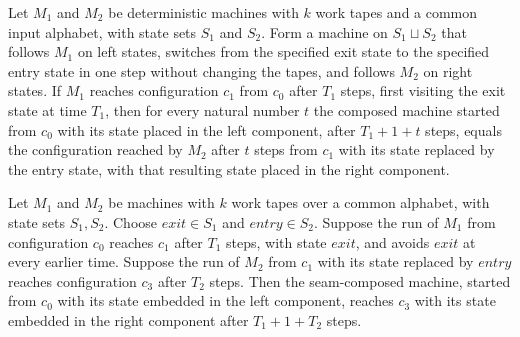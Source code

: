 \begin{theorem}
\label{Turing.seamCompTM_runFrom_right}
\leanok
{}
Let $M_1$ and $M_2$ be deterministic machines with $k$ work tapes and a common input
alphabet, with state sets $S_1$ and $S_2$. Form a machine on $S_1\sqcup S_2$ that
follows $M_1$ on left states, switches from the specified exit state to the specified
entry state in one step without changing the tapes, and follows $M_2$ on right states.
If $M_1$ reaches configuration $c_1$ from $c_0$ after $T_1$ steps, first visiting the
exit state at time $T_1$, then for every natural number $t$ the composed machine started
from $c_0$ with its state placed in the left component, after $T_1+1+t$ steps, equals
the configuration reached by $M_2$ after $t$ steps from $c_1$ with its state replaced by
the entry state, with that resulting state placed in the right component.
\end{theorem}

\begin{lemma}
\label{Turing.seamComp_run_general}
\leanok
{}
Let $M_1$ and $M_2$ be machines with $k$ work tapes over a common alphabet, with state
sets $S_1,S_2$. Choose $exit\in S_1$ and $entry\in S_2$. Suppose the run of $M_1$ from
configuration $c_0$ reaches $c_1$ after $T_1$ steps, with state $exit$, and avoids
$exit$ at every earlier time. Suppose the run of $M_2$ from $c_1$ with its state
replaced by $entry$ reaches configuration $c_3$ after $T_2$ steps. Then the
seam-composed machine, started from $c_0$ with its state embedded in the left component,
reaches $c_3$ with its state embedded in the right component after $T_1+1+T_2$ steps.
\end{lemma}

